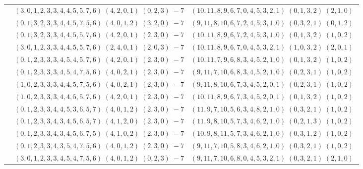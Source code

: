 \documentclass[11pt]{article}
\begin{document}
\begin{longtable}[l]{|c|c|c|}
 \cline{2-3} 
 & $(3 ,0 ,1 ,2 ,3 ,3 ,4 ,4 ,5 ,5 ,7 ,6) \;(4 ,2 ,0 ,1) \;(0 ,2 ,3) \;-7$ & $(10 ,11 ,8 ,9 ,6 ,7 ,0 ,4 ,5 ,3 ,2 ,1) \;(0 ,1 ,3 ,2) \;(2 ,1 ,0) \;$\\ 
 \cline{2-3} 
 & $(0 ,1 ,3 ,2 ,3 ,3 ,4 ,4 ,5 ,7 ,5 ,6) \;(4 ,0 ,1 ,2) \;(3 ,2 ,0) \;-7$ & $(9 ,11 ,8 ,10 ,6 ,7 ,2 ,4 ,5 ,3 ,1 ,0) \;(0 ,3 ,2 ,1) \;(0 ,1 ,2) \;$\\ 
 \cline{2-3} 
 & $(0 ,1 ,3 ,2 ,3 ,3 ,4 ,4 ,5 ,5 ,7 ,6) \;(4 ,2 ,0 ,1) \;(2 ,3 ,0) \;-7$ & $(10 ,11 ,8 ,9 ,6 ,7 ,2 ,4 ,5 ,3 ,1 ,0) \;(0 ,1 ,3 ,2) \;(1 ,0 ,2) \;$\\ 
 \cline{2-3} 
 & $(3 ,0 ,1 ,2 ,3 ,3 ,4 ,4 ,5 ,5 ,7 ,6) \;(2 ,4 ,0 ,1) \;(2 ,0 ,3) \;-7$ & $(10 ,11 ,8 ,9 ,6 ,7 ,0 ,4 ,5 ,3 ,2 ,1) \;(1 ,0 ,3 ,2) \;(2 ,0 ,1) \;$\\ 
 \cline{2-3} 
 & $(0 ,1 ,2 ,3 ,3 ,3 ,4 ,5 ,4 ,5 ,7 ,6) \;(4 ,2 ,0 ,1) \;(2 ,3 ,0) \;-7$ & $(10 ,11 ,7 ,9 ,6 ,8 ,3 ,4 ,5 ,2 ,1 ,0) \;(0 ,1 ,3 ,2) \;(1 ,0 ,2) \;$\\ 
 \cline{2-3} 
 & $(0 ,1 ,2 ,3 ,3 ,3 ,4 ,5 ,4 ,7 ,5 ,6) \;(4 ,0 ,2 ,1) \;(2 ,3 ,0) \;-7$ & $(9 ,11 ,7 ,10 ,6 ,8 ,3 ,4 ,5 ,2 ,1 ,0) \;(0 ,2 ,3 ,1) \;(1 ,0 ,2) \;$\\ 
 \cline{2-3} 
 & $(1 ,0 ,2 ,3 ,3 ,3 ,4 ,4 ,5 ,7 ,5 ,6) \;(4 ,0 ,2 ,1) \;(2 ,3 ,0) \;-7$ & $(9 ,11 ,8 ,10 ,6 ,7 ,3 ,4 ,5 ,2 ,0 ,1) \;(0 ,2 ,3 ,1) \;(1 ,0 ,2) \;$\\ 
 \cline{2-3} 
 & $(1 ,0 ,2 ,3 ,3 ,3 ,4 ,4 ,5 ,5 ,7 ,6) \;(4 ,2 ,0 ,1) \;(2 ,3 ,0) \;-7$ & $(10 ,11 ,8 ,9 ,6 ,7 ,3 ,4 ,5 ,2 ,0 ,1) \;(0 ,1 ,3 ,2) \;(1 ,0 ,2) \;$\\ 
 \cline{2-3} 
 & $(0 ,1 ,2 ,3 ,3 ,4 ,4 ,5 ,3 ,6 ,5 ,7) \;(4 ,0 ,1 ,2) \;(2 ,3 ,0) \;-7$ & $(11 ,9 ,7 ,10 ,5 ,6 ,3 ,4 ,8 ,2 ,1 ,0) \;(0 ,3 ,2 ,1) \;(1 ,0 ,2) \;$\\ 
 \cline{2-3} 
 & $(0 ,1 ,2 ,3 ,3 ,4 ,3 ,4 ,5 ,6 ,5 ,7) \;(4 ,1 ,2 ,0) \;(2 ,3 ,0) \;-7$ & $(11 ,9 ,8 ,10 ,5 ,7 ,3 ,4 ,6 ,2 ,1 ,0) \;(0 ,2 ,1 ,3) \;(1 ,0 ,2) \;$\\ 
 \cline{2-3} 
 & $(0 ,1 ,2 ,3 ,3 ,4 ,3 ,4 ,5 ,6 ,7 ,5) \;(4 ,1 ,0 ,2) \;(2 ,3 ,0) \;-7$ & $(10 ,9 ,8 ,11 ,5 ,7 ,3 ,4 ,6 ,2 ,1 ,0) \;(0 ,3 ,1 ,2) \;(1 ,0 ,2) \;$\\ 
 \cline{2-3} 
 & $(0 ,1 ,2 ,3 ,3 ,4 ,3 ,5 ,4 ,7 ,5 ,6) \;(4 ,0 ,1 ,2) \;(2 ,3 ,0) \;-7$ & $(9 ,11 ,7 ,10 ,5 ,8 ,3 ,4 ,6 ,2 ,1 ,0) \;(0 ,3 ,2 ,1) \;(1 ,0 ,2) \;$\\ 
 \cline{2-3} 
 & $(3 ,0 ,1 ,2 ,3 ,3 ,4 ,5 ,4 ,7 ,5 ,6) \;(4 ,0 ,1 ,2) \;(0 ,2 ,3) \;-7$ & $(9 ,11 ,7 ,10 ,6 ,8 ,0 ,4 ,5 ,3 ,2 ,1) \;(0 ,3 ,2 ,1) \;(2 ,1 ,0) \;$\\ 

\end{longtable}
\end{document}
